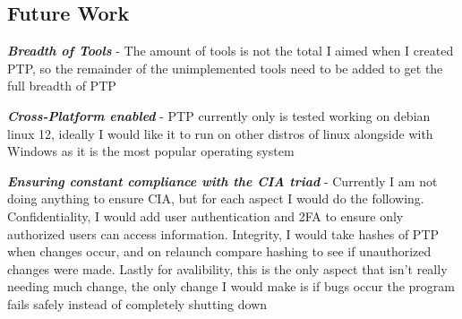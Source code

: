 \documentclass{article}
\begin{document}
\subsection{Future Work}
\begin{center}
    \textbf{\textit{Breadth of Tools}} - The amount of tools is not the total I aimed when I created PTP, so the remainder of the unimplemented tools need to be added to get the full breadth of PTP
\end{center}
\begin{center}
    \textbf{\textit{Cross-Platform enabled}} - PTP currently only is tested working on debian linux 12, ideally I would like it to run on other distros of linux alongside with Windows as it is the most popular operating system
\end{center}
\begin{center}
    \textbf{\textit{Ensuring constant compliance with the CIA triad}} - Currently I am not doing anything to ensure CIA, but for each aspect I would do the following. Confidentiality, I would add user authentication and 2FA to ensure only authorized users can access information. Integrity, I would take hashes of PTP when changes occur, and on relaunch compare hashing to see if unauthorized changes were made. Lastly for avalibility, this is the only aspect that isn't really needing much change, the only change I would make is if bugs occur the program fails safely instead of completely shutting down
\end{center}
\end{document}
